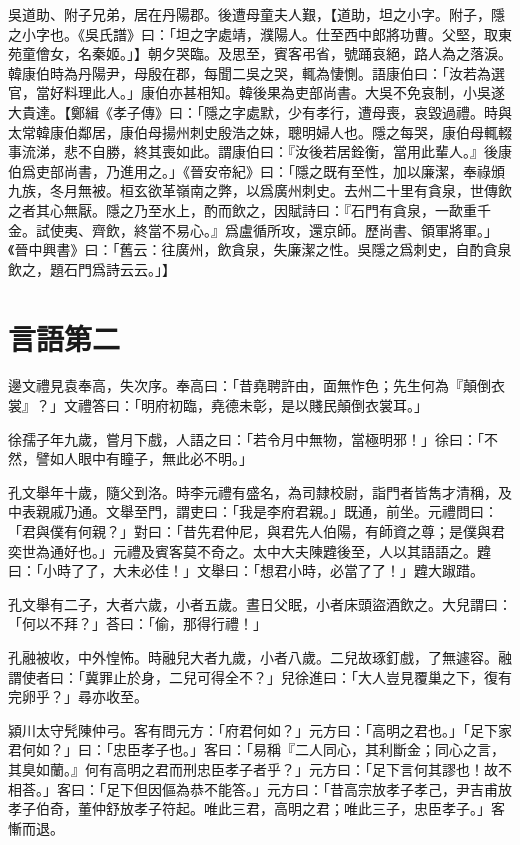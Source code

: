 吳道助、附子兄弟，居在丹陽郡。後遭母童夫人艱，【道助，坦之小字。附子，隱之小字也。《吳氏譜》曰：「坦之字處靖，濮陽人。仕至西中郎將功曹。父堅，取東苑童儈女，名秦姬。」】朝夕哭臨。及思至，賓客弔省，號踊哀絕，路人為之落淚。韓康伯時為丹陽尹，母殷在郡，每聞二吳之哭，輒為悽惻。語康伯曰：「汝若為選官，當好料理此人。」康伯亦甚相知。韓後果為吏部尚書。大吳不免哀制，小吳遂大貴達。【鄭緝《孝子傳》曰：「隱之字處默，少有孝行，遭母喪，哀毀過禮。時與太常韓康伯鄰居，康伯母揚州刺史殷浩之妹，聰明婦人也。隱之每哭，康伯母輒輟事流涕，悲不自勝，終其喪如此。謂康伯曰：『汝後若居銓衡，當用此輩人。』後康伯爲吏部尚書，乃進用之。」《晉安帝紀》曰：「隱之既有至性，加以廉潔，奉祿頒九族，冬月無被。桓玄欲革嶺南之弊，以爲廣州刺史。去州二十里有貪泉，世傳飲之者其心無厭。隱之乃至水上，酌而飲之，因賦詩曰：『石門有貪泉，⼀歃重千金。試使夷、齊飲，終當不易⼼。』爲盧循所攻，還京師。歷尚書、領軍將軍。」《晉中興書》曰：「舊云：往廣州，飲貪泉，失廉潔之性。吳隱之爲刺史，自酌貪泉飲之，題石門爲詩云云。」】



\chapter{言語第二}

邊文禮見袁奉高，失次序。奉高曰：「昔堯聘許由，面無怍色；先生何為『顛倒衣裳』？」文禮答曰：「明府初臨，堯德未彰，是以賤民顛倒衣裳耳。」

徐孺子年九歲，嘗月下戲，人語之曰：「若令月中無物，當極明邪！」徐曰：「不然，譬如人眼中有瞳子，無此必不明。」

孔文舉年十歲，隨父到洛。時李元禮有盛名，為司隸校尉，詣門者皆雋才清稱，及中表親戚乃通。文舉至門，謂吏曰：「我是李府君親。」既通，前坐。元禮問曰：「君與僕有何親？」對曰：「昔先君仲尼，與君先人伯陽，有師資之尊；是僕與君奕世為通好也。」元禮及賓客莫不奇之。太中大夫陳韙後至，人以其語語之。韙曰：「小時了了，大未必佳！」文舉曰：「想君小時，必當了了！」韙大踧踖。

孔文舉有二子，大者六歲，小者五歲。晝日父眠，小者床頭盜酒飲之。大兒謂曰：「何以不拜？」荅曰：「偷，那得行禮！」

孔融被收，中外惶怖。時融兒大者九歲，小者八歲。二兒故琢釘戲，了無遽容。融謂使者曰：「冀罪止於身，二兒可得全不？」兒徐進曰：「大人豈見覆巢之下，復有完卵乎？」尋亦收至。

潁川太守髠陳仲弓。客有問元方：「府君何如？」元方曰：「高明之君也。」「足下家君何如？」曰：「忠臣孝子也。」客曰：「易稱『二人同心，其利斷金；同心之言，其臭如蘭。』何有高明之君而刑忠臣孝子者乎？」元方曰：「足下言何其謬也！故不相荅。」客曰：「足下但因傴為恭不能答。」元方曰：「昔高宗放孝子孝己，尹吉甫放孝子伯奇，董仲舒放孝子符起。唯此三君，高明之君；唯此三子，忠臣孝子。」客慚而退。

